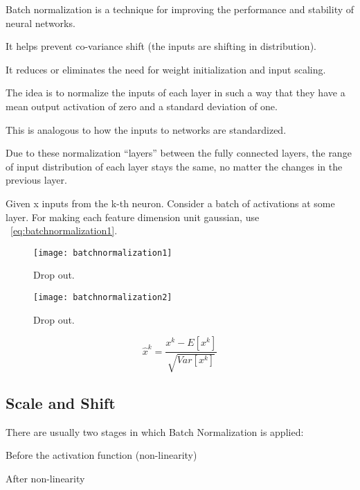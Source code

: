 	\begin{bulletedlist}
		\item Batch normalization is a technique for improving the performance and stability of neural networks.
		\item It helps prevent co-variance shift (the inputs are shifting in distribution).
		\item It reduces or eliminates the need for weight initialization and input scaling.
		\item The idea is to normalize the inputs of each layer in such a way that they have a mean output activation of zero and a standard deviation of one.
		\item This is analogous to how the inputs to networks are standardized.
		\item Due to these normalization ``layers'' between the fully connected layers, the range of input distribution of each layer stays the same, no matter the changes in the previous layer.
		\item Given x inputs from the k-th neuron. Consider a batch of activations at some layer. For making each feature dimension unit gaussian, use \equationname~\ref{eq:batchnormalization1}.
	\end{bulletedlist}

 	\begin{figure}[h]
		\centering
		\texttt{[image: batchnormalization1]}
		\caption{Drop out.}
		\label{fig:batchnormalization1}
	\end{figure}
 	\begin{figure}[h]
		\centering
		\texttt{[image: batchnormalization2]}
		\caption{Drop out.}
		\label{fig:batchnormalization2}
	\end{figure}

	\begin{equation}
		\hat{x}^k = \frac{x^k - E\left[x^k \right]}{\sqrt{Var\left[x^k \right]}}
		\label{eq:batchnormalization1}
	\end{equation}

	\subsection{Scale and Shift}
There are usually two stages in which Batch Normalization is applied:
	\begin{numberedlist}
		\item Before the activation function (non-linearity)
		\item After non-linearity
	\end{numberedlist}

